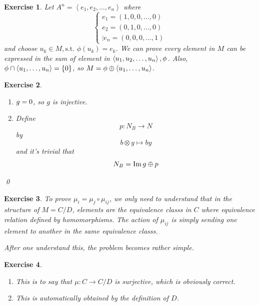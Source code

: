 \documentclass{article}
\theoremstyle{breakstyle}
\newtheorem{exercise}{Exercise}
\let\ker\relax
\DeclareMathOperator{\ker}{Ker}
\DeclareMathOperator{\im}{Im}
\begin{document}
\begin{exercise}
    Let $A^{n}=\left<e_1,e_2,\ldots ,e_{n} \right> $ where
    $$
    \begin{cases}
        e_1=\left( 1,0,0,\ldots ,0 \right) \\
        e_2=\left( 0,1,0,\ldots ,0\right)\\
        \vdots
        e_{n}=\left( 0,0,0,\ldots ,1 \right) 
    \end{cases}
    $$
    and choose $u_{k}\in M,\text{s.t. }\phi(u_{k})=e_{k}$.
    We can prove every element in $M$ can be expressed in the sum of element in $\left<u_1,u_2,\ldots ,u_{n} \right> ,\ker{\phi}$.
    Also, $\ker{\phi}\cap \left<u_1,\ldots,u_{n} \right> =\left\{ 0 \right\} $,
    so $M=\ker{\phi}\oplus \left<u_1,\ldots ,u_{n} \right>$.
\end{exercise}

\begin{exercise}
    \leavevmode \vspace{-\baselineskip}
    \begin{enumerate}[label=({\roman*})]
        \item $\ker{g}=0$, so $g$ is injective.
        \item Define
            $$
            p:N_{B}\longrightarrow N
            $$
            by
            $$
            b\otimes y\longmapsto by
            $$
            and it's trivial that
            $$
            N_{B}=\im{g}\oplus \ker{p}
            $$
    \end{enumerate}
    \qed
\end{exercise}

\begin{exercise}
    To prove $\mu_{i}=\mu_{j}\circ \mu_{ij}$,
    we only need to understand that in the structure of $M=C / D$,
    elements are the equivalence classs in $C$ where equivalence relation defined by homomorphisms.
    The action of $\mu_{ij}$ is simply sending one element to another in the same equivalence classs.

    After one understand this, the problem becomes rather simple.
\end{exercise}

\begin{exercise}
    \leavevmode \vspace{-\baselineskip}
    \begin{enumerate}[label=({\roman*})]
        \item This is to say that $\mu:C\longrightarrow C / D$ is surjective, which is obviously correct.
        \item This is automatically obtained by the definition of $D$.
    \end{enumerate}
\end{exercise}
\end{document}
